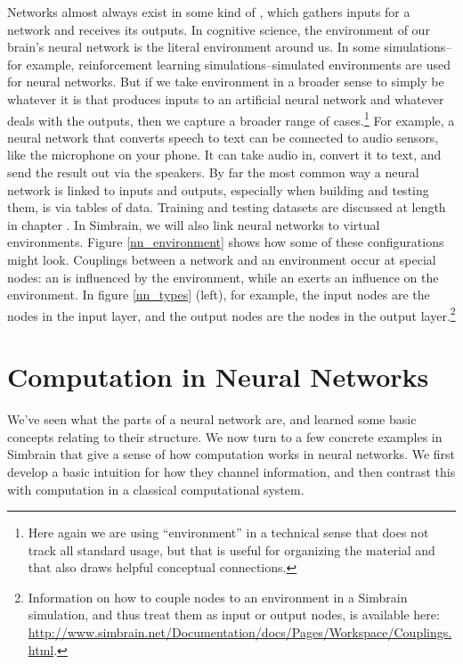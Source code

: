 Networks almost always exist in some kind of  , which gathers inputs for a network and receives its outputs. In cognitive science, the environment of our brain's neural network is the literal environment around us. In some simulations--for example, reinforcement learning simulations--simulated environments are used for neural networks. But if we take environment in a broader sense to simply be whatever it is that produces inputs to an artificial neural network and whatever deals with the outputs, then we capture a broader range of cases.\footnote{Here again we are using ``environment'' in a technical sense that does not track all standard usage, but that is useful for organizing the material and that also draws helpful conceptual connections.}  For example, a neural network that converts speech to text can be connected to audio sensors, like the microphone on your phone. It can take audio in, convert it to text, and send the result out via the speakers. By far the most common way a neural network is linked to inputs and outputs, especially when building and testing them, is via tables of data. Training and testing datasets are discussed at length in chapter . In Simbrain, we will also link neural networks to virtual environments. Figure \ref{nn_environment} shows how some of these configurations might look. Couplings between a network and an environment occur at special nodes:  an   is influenced by the environment, while an   exerts an influence on the environment. In figure \ref{nn_types} (left), for example, the input nodes are the nodes in the input layer, and the output nodes are the nodes in the output layer.\footnote{Information on how to couple nodes to an environment in a Simbrain simulation, and thus treat them as input or output nodes, is available here: \url{http://www.simbrain.net/Documentation/docs/Pages/Workspace/Couplings.html}.} 

\section{Computation in Neural Networks}\label{intro_comp_nn}

We've seen what the parts of a neural network are, and learned some basic concepts relating to their structure. We now turn to a few concrete examples in Simbrain that give a sense of how computation works in neural networks. We first develop a basic intuition for how they channel information, and then contrast this with computation in a classical computational system.


